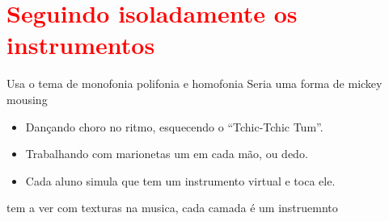 
\section{\textcolor{red}{Seguindo isoladamente os instrumentos}}
\label{sec:seguindoinstrumentos}
Usa o tema de monofonia polifonia e homofonia
Seria uma forma de mickey mousing
\begin{itemize}
\item Dançando choro no ritmo, esquecendo o ``Tchic-Tchic Tum''.
\item Trabalhando com marionetas um em cada mão, ou dedo.
\item Cada aluno simula que tem um instrumento virtual e toca ele.
\end{itemize}

tem a ver com texturas na musica, cada camada é um instruemnto


